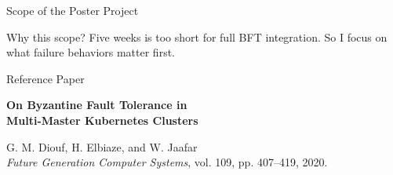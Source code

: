\documentclass{beamer}
\begin{document}
\begin{frame}{Scope of the Poster Project}
\begin{table}
\centering
\small
{}
\end{table}

\vspace{0.2cm}
\begin{block}{Why this scope?}
Five weeks is too short for full BFT integration.  
So I focus on what failure behaviors matter first.
\end{block}
\end{frame}

\begin{frame}{Reference Paper}
\begin{center}
{\Large\bfseries On Byzantine Fault Tolerance in\\
Multi-Master Kubernetes Clusters}

\vspace{0.8cm}

{\footnotesize
G. M. Diouf, H. Elbiaze, and W. Jaafar\\
\textit{Future Generation Computer Systems}, vol. 109, pp. 407--419, 2020.}
\end{center}
\end{frame}
\end{document}
